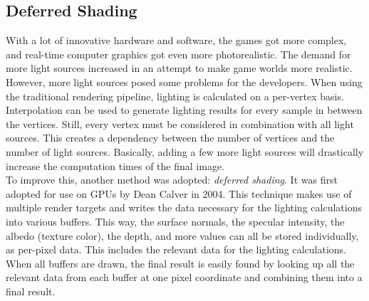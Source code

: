 \subsection*{Deferred Shading} \label{subsec-deferred-rendering}

With a lot of innovative hardware and software, the games got more complex, and real-time computer graphics got even 
more photorealistic. The demand for more light sources increased in an attempt to make game worlds more realistic. 
However, more light sources posed some problems for the developers. When using the traditional rendering pipeline, 
lighting is calculated on a per-vertex basis. Interpolation can be used to generate lighting results for every sample 
in between the vertices. Still, every vertex must be considered in combination with all light sources. This creates a 
dependency between the number of vertices and the number of light sources. Basically, adding a few more light sources 
will drastically increase the computation times of the final image. \\

\noindent
To improve this, another method was adopted: \emph{deferred shading}. It was first adopted for use on \ac{GPU}s 
by Dean Calver \cite{Calver2004} in 2004. This technique makes use of multiple render targets and writes the data 
necessary for the lighting calculations into various buffers. This way, the surface normals, the specular intensity, 
the albedo (texture color), the depth, and more values can all be stored individually, as per-pixel data. This includes 
the relevant data for the lighting calculations. When all buffers are drawn, the final result is easily found by 
looking up all the relevant data from each buffer at one pixel coordinate and combining them into a final result. \\

